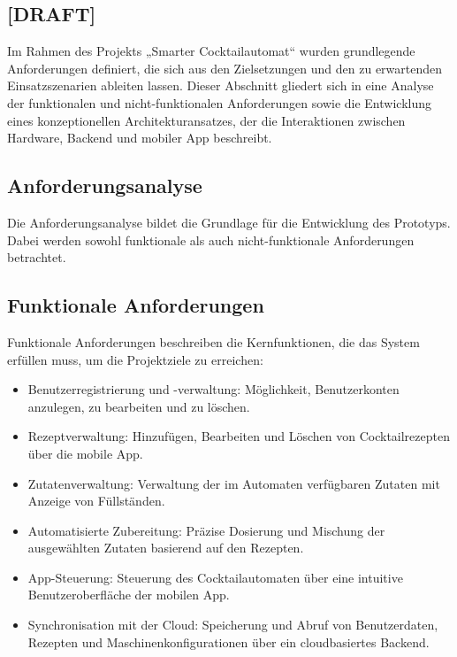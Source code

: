 

\subsection{\textbf{[DRAFT]}}

Im Rahmen des Projekts „Smarter Cocktailautomat“ wurden grundlegende Anforderungen definiert, die sich aus den Zielsetzungen und den zu erwartenden Einsatzszenarien ableiten lassen. Dieser Abschnitt gliedert sich in eine Analyse der funktionalen und nicht-funktionalen Anforderungen sowie die Entwicklung eines konzeptionellen Architekturansatzes, der die Interaktionen zwischen Hardware, Backend und mobiler App beschreibt.

\subsection{Anforderungsanalyse}

Die Anforderungsanalyse bildet die Grundlage für die Entwicklung des Prototyps. Dabei werden sowohl funktionale als auch nicht-funktionale Anforderungen betrachtet.

\subsection{Funktionale Anforderungen}

Funktionale Anforderungen beschreiben die Kernfunktionen, die das System erfüllen muss, um die Projektziele zu erreichen:
\begin{itemize}
	  \item Benutzerregistrierung und -verwaltung: Möglichkeit, Benutzerkonten anzulegen, zu bearbeiten und zu löschen.
	  \item Rezeptverwaltung: Hinzufügen, Bearbeiten und Löschen von Cocktailrezepten über die mobile App.
	  \item Zutatenverwaltung: Verwaltung der im Automaten verfügbaren Zutaten mit Anzeige von Füllständen.
	  \item Automatisierte Zubereitung: Präzise Dosierung und Mischung der ausgewählten Zutaten basierend auf den Rezepten.
	  \item App-Steuerung: Steuerung des Cocktailautomaten über eine intuitive Benutzeroberfläche der mobilen App.
	  \item Synchronisation mit der Cloud: Speicherung und Abruf von Benutzerdaten, Rezepten und Maschinenkonfigurationen über ein cloudbasiertes Backend.
\end{itemize}

